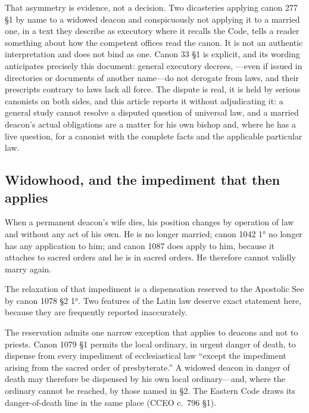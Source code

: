 That asymmetry is evidence, not a decision. Two dicasteries applying canon 277 §1 by name to a widowed deacon and conspicuously not applying it to a married one, in a text they describe as executory where it recalls the Code, tells a reader something about how the competent offices read the canon. It is not an authentic interpretation and does not bind as one. Canon 33 §1 is explicit, and its wording anticipates precisely this document: general executory decrees, ---even if issued in directories or documents of another name---do not derogate from laws, and their prescripts contrary to laws lack all force. The dispute is real, it is held by serious canonists on both sides, and this article reports it without adjudicating it: a general study cannot resolve a disputed question of universal law, and a married deacon's actual obligations are a matter for his own bishop and, where he has a live question, for a canonist with the complete facts and the applicable particular law.

\subsection{Widowhood, and the impediment that then applies}

When a permanent deacon's wife dies, his position changes by operation of law and without any act of his own. He is no longer married; canon 1042 1° no longer has any application to him; and canon 1087 does apply to him, because it attaches to sacred orders and he is in sacred orders. He therefore cannot validly marry again.

The relaxation of that impediment is a dispensation reserved to the Apostolic See by canon 1078 §2 1°. Two features of the Latin law deserve exact statement here, because they are frequently reported inaccurately.

The reservation admits one narrow exception that applies to deacons and not to priests. Canon 1079 §1 permits the local ordinary, in urgent danger of death, to dispense from every impediment of ecclesiastical law ``except the impediment arising from the sacred order of presbyterate.'' A widowed deacon in danger of death may therefore be dispensed by his own local ordinary---and, where the ordinary cannot be reached, by those named in §2. The Eastern Code draws its danger-of-death line in the same place (CCEO c.~796 §1).

